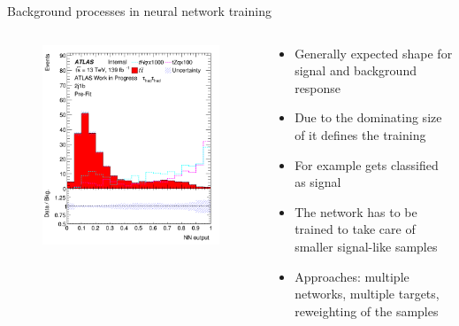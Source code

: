 \begin{frame}{Background processes in neural network training}
    \begin{columns}
        \begin{column}{0.5\textwidth}
            \begin{figure}
                \centering
                \includegraphics[width=\textwidth]{sgBkgComp}
            \end{figure}
        \end{column}
        \begin{column}{0.5\textwidth}
            \begin{itemize}
                \item Generally expected shape for signal and background response
                \item Due to the dominating size of \ttbar it defines the training
                \item For example \tZq gets classified as signal
                \item The network has to be trained to take care of smaller signal-like samples
                \item Approaches: multiple networks, multiple targets, reweighting of the samples
            \end{itemize}
        \end{column}
    \end{columns}
\end{frame}